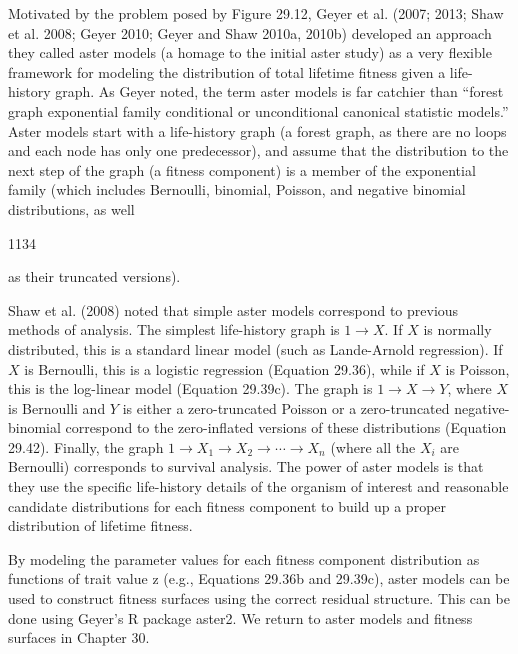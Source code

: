 \documentclass{article}
\begin{document}
Motivated by the problem posed by Figure 29.12, Geyer et al. (2007; 2013; Shaw et al. 2008; Geyer 2010; Geyer and Shaw 2010a, 2010b) developed an approach they called aster models (a homage to the initial aster study) as a very flexible framework for modeling the distribution of total lifetime fitness given a life-history graph. As Geyer noted, the term aster models is far catchier than “forest graph exponential family conditional or unconditional canonical statistic models.” Aster models start with a life-history graph (a forest graph, as there are no loops and each node has only one predecessor), and assume that the distribution to the next step of the graph (a fitness component) is a member of the exponential family (which includes Bernoulli, binomial, Poisson, and negative binomial distributions, as well

1134

as their truncated versions).

Shaw et al. (2008) noted that simple aster models correspond to previous methods of analysis. The simplest life-history graph is $1 \to X$. If $X$ is normally distributed, this is a standard linear model (such as Lande-Arnold regression). If $X$ is Bernoulli, this is a logistic regression (Equation 29.36), while if $X$ is Poisson, this is the log-linear model (Equation 29.39c). The graph is $1 \to X \to Y$, where $X$ is Bernoulli and $Y$ is either a zero-truncated Poisson or a zero-truncated negative-binomial correspond to the zero-inflated versions of these distributions (Equation 29.42). Finally, the graph $1 \to X_1 \to X_2 \to \cdots \to X_n$ (where all the $X_i$ are Bernoulli) corresponds to survival analysis. The power of aster models is that they use the specific life-history details of the organism of interest and reasonable candidate distributions for each fitness component to build up a proper distribution of lifetime fitness.

By modeling the parameter values for each fitness component distribution as functions of trait value z (e.g., Equations 29.36b and 29.39c), aster models can be used to construct fitness surfaces using the correct residual structure. This can be done using Geyer's R package aster2. We return to aster models and fitness surfaces in Chapter 30.
\end{document}
